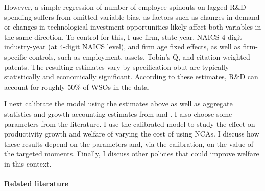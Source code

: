 \documentclass[11pt,english]{article}
\begin{document}
However, a simple regression of number of employee spinouts on lagged R\&D spending suffers from omitted variable bias, as factors such as changes in demand or changes in technological investment opportunities likely affect both variables in the same direction. To control for this, I use firm, state-year, NAICS 4 digit industry-year (at 4-digit NAICS level), and firm age fixed effects, as well as firm-specific controls, such as employment, assets, Tobin's Q, and citation-weighted patents. The resulting estimates vary by specification obut are typically statistically and economically significant. According to these estimates, R\&D can account for roughly 50\% of WSOs in the data. 

I next calibrate the model using the estimates above as well as aggregate statistics and growth accounting estimates from \cite{garcia-macia_how_2019} and \cite{klenow_innovative_2020}. I also choose some parameters from the literature. I use the calibrated model to study the effect on productivity growth and welfare of varying the cost of using NCAs. I discuss how these results depend on the parameters and, via the calibration, on the value of the targeted moments. Finally, I discuss other policies that could improve welfare in this context.

\paragraph{Related literature}
\end{document}

